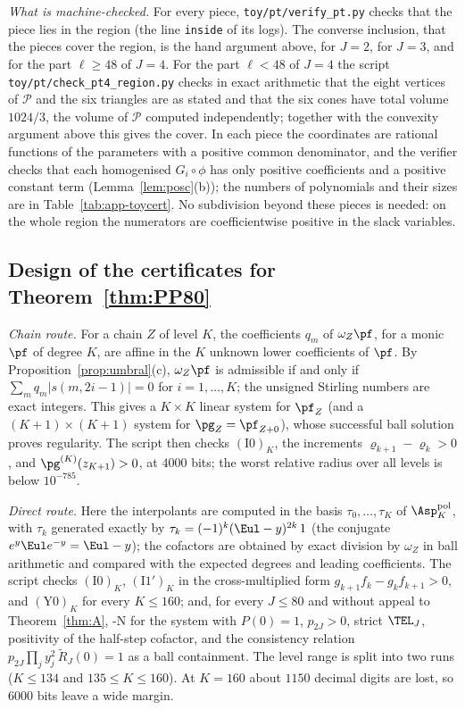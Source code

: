 \emph{What is machine-checked.} For every piece, \nolinkurl{toy/pt/verify_pt.py} checks that the piece lies in the region
(the line \texttt{inside} of its logs). The converse inclusion, that the pieces cover the region, is the hand argument
above, for $J=2$, for $J=3$, and for the part $\ell\ge48$ of $J=4$. For the part $\ell<48$ of $J=4$ the script
\nolinkurl{toy/pt/check_pt4_region.py} checks in exact arithmetic that the eight vertices of $\mathcal P$ and the six
triangles are as stated and that the six cones have total volume $1024/3$, the volume of $\mathcal P$ computed
independently; together with the convexity argument above this gives the cover.
In each piece the coordinates are rational functions of the parameters with a positive common denominator, and the
verifier checks that each homogenised $G_i\circ\phi$ has only positive coefficients and a positive constant term
(Lemma~\ref{lem:posc}(b)); the numbers of polynomials and their sizes are in Table~\ref{tab:app-toycert}. No subdivision
beyond these pieces is needed: on the whole region the numerators are coefficientwise positive in the slack variables.

\subsection{Design of the certificates for Theorem~\texorpdfstring{\ref{thm:PP80}}{PP80}}\label{app:PP80}

\emph{Chain route.} For a chain $Z$ of level $K$, the coefficients $q_m$ of $\omega_Z\pf$, for a monic $\pf$ of degree
$K$, are affine in the $K$ unknown lower coefficients of $\pf$. By Proposition~\ref{prop:umbral}(c), $\omega_Z\pf$ is
admissible if and only if $\sum_mq_m|s(m,2i-1)|=0$ for $i=1,\dots,K$; the unsigned Stirling numbers are exact
integers. This gives a $K\times K$ linear system for $\pf_Z$ (and a $(K+1)\times(K+1)$ system for $\pg_Z=\pf_{Z+0}$), whose
successful ball solution proves regularity. The script then checks $(\mathrm{I0})_K$, the increments
$\varrho_{k+1}-\varrho_k>0$, and $\pg^{(K)}(z_{K+1})>0$, at $4000$ bits; the worst relative radius over all levels is below
$10^{-785}$.

\emph{Direct route.} Here the interpolants are computed in the basis $\tau_0,\dots,\tau_K$ of $\Asp^{\mathrm{pol}}_K$,
with $\tau_k$ generated exactly by $\tau_k=(-1)^k(\Eul-y)^{2k}\,1$ (the conjugate $e^y\Eul e^{-y}=\Eul-y$); the cofactors are
obtained by exact division by $\omega_Z$ in ball arithmetic and compared with the expected degrees and leading
coefficients. The script checks $(\mathrm{I0})_K$, $(\mathrm{I1}')_K$ in the cross-multiplied form
$g_{k+1}f_k-g_kf_{k+1}>0$, and $(\mathrm{Y0})_K$ for every $K\le160$; and, for every $J\le80$ and without appeal to
Theorem~\ref{thm:A}, \hyp{N} for the system with $P(0)=1$, $p_{2J}>0$, strict $\TEL_J$, positivity of the half-step
cofactor, and the consistency relation $p_{2J}\prod_jy_j^2\,\tilde R_J(0)=1$ as a ball containment. The level range is
split into two runs ($K\le134$ and $135\le K\le160$). At
$K=160$ about $1150$ decimal digits are lost, so $6000$ bits leave a wide margin.

